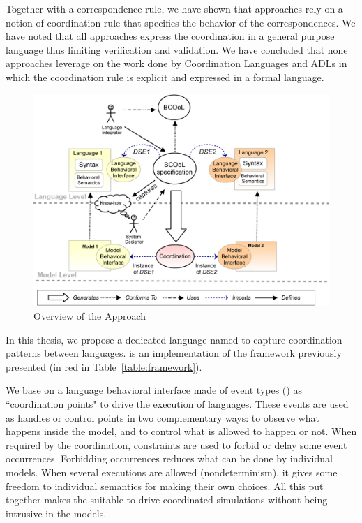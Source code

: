 Together with a correspondence rule, we have shown that approaches rely on a notion of coordination rule that specifies the behavior of the correspondences. We have noted that all approaches express the coordination in a general purpose language thus limiting verification and validation. We have concluded that none approaches leverage on the work done by Coordination Languages and ADLs in which the coordination rule is explicit and expressed in a formal language.  

\begin{figure}
	\begin{center}
		\includegraphics[width=1\textwidth]{framework/figs/bcool}
		\caption{Overview of the Approach}
		\label{fig:bcool}
	\end{center}
\end{figure}

In this thesis, we propose a dedicated language named \bcool to capture coordination patterns between languages. \bcool is an implementation of the framework previously presented (in red in Table~\ref{table:framework}).  

We base on a language behavioral interface made of event types (\ie \dse\cite{sle13-combemale}) as ``coordination points" to drive the execution of languages. These events are used as handles or control points in two complementary ways: to observe what happens inside the model, and to control what is allowed to happen or not. When required by the coordination, constraints are used to forbid or delay some event occurrences. Forbidding occurrences reduces what can be done by individual models. When several executions are allowed
(nondeterminism), it gives some freedom to individual semantics for making their own choices. All this put together makes the \dse suitable to drive coordinated simulations without being intrusive in the models. 

